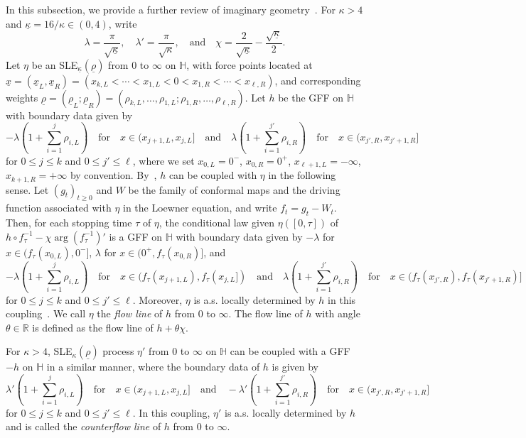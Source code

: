 \documentclass[a4paper]{article}
\numberwithin{equation}{section}
\numberwithin{equation}{section}
\renewcommand{\1}{\mathbf{1}}
\begin{document}
In this subsection, we provide a further review of imaginary geometry~\cite{IG1,IG4}. For $\kappa>4$ and $\underline{\kappa}=16/\kappa \in (0,4)$, write
\begin{equation}\label{eq:ig-parameter}
    \lambda=\frac{\pi}{\sqrt{\underline{\kappa}}}, \quad \lambda'=\frac{\pi}{\sqrt{\kappa}}, \quad \mbox{and} \quad \chi=\frac{2}{\sqrt{\underline{\kappa}}}-\frac{\sqrt{\underline{\kappa}}}{2}.
\end{equation}
Let $\eta$ be an SLE$_{\underline{\kappa}}(\underline{\rho})$ from 0 to $\infty$ on $\mathbb H$, with force points located at $\underline{x}=(\underline{x}_L,\underline{x}_R)=(x_{k,L}<\cdots<x_{1,L}<0<x_{1,R}<\cdots<x_{\ell,R})$, and corresponding weights $\underline{\rho}=(\underline{\rho}_L;\underline{\rho}_R)=(\rho_{k,L},\ldots,\rho_{1,L};\rho_{1,R},\ldots,\rho_{\ell,R})$. Let $h$ be the GFF on $\mathbb H$ with boundary data given by
\begin{equation}\label{eq:ig-boundary-data-simple}
    -\lambda(1+\sum_{i=1}^j \rho_{i,L}) \quad \mbox{for} \quad x \in (x_{j+1,L},x_{j,L}] \quad \mbox{and} \quad \lambda(1+\sum_{i=1}^{j'} \rho_{i,R}) \quad \mbox{for} \quad x \in (x_{j',R},x_{j'+1,R}]
\end{equation}
for $0 \le j \le k$ and $0 \le j' \le \ell$, where we set $x_{0,L}=0^-$, $x_{0,R}=0^+$, $x_{\ell+1,L}=-\infty$, $x_{k+1,R}=+\infty$ by convention. By~\cite[Theorem 1.1]{IG1}, $h$ can be coupled with $\eta$ in the following sense. Let $(g_t)_{t \ge 0}$ and $W$ be the family of conformal maps and the driving function associated with $\eta$ in the Loewner equation, and write $f_t=g_t-W_t$. Then, for each stopping time $\tau$ of $\eta$, the conditional law given $\eta([0,\tau])$ of $h \circ f_\tau^{-1}-\chi \arg (f_\tau^{-1})'$ is a GFF on $\mathbb H$ with boundary data given by $-\lambda$ for $x \in (f_\tau(x_{0,L}),0^-]$, $\lambda$ for $x \in (0^+,f_\tau(x_{0,R})]$, and
\[ -\lambda(1+\sum_{i=1}^j \rho_{i,L}) \quad \mbox{for} \quad x \in (f_\tau(x_{j+1,L}),f_\tau(x_{j,L}]) \quad \mbox{and} \quad \lambda(1+\sum_{i=1}^{j'} \rho_{i,R}) \quad \mbox{for} \quad x \in (f_\tau(x_{j',R}),f_\tau(x_{j'+1,R})] \]
for $0 \le j \le k$ and $0 \le j' \le \ell$. Moreover, $\eta$ is a.s. locally determined by $h$ in this coupling~\cite[Theorem 1.2]{IG1}. We call $\eta$ the \emph{flow line} of $h$ from 0 to $\infty$. The flow line of $h$ with angle $\theta \in \mathbb R$ is defined as the flow line of $h+\theta\chi$. 

For $\kappa>4$, SLE$_\kappa(\underline{\rho})$ process $\eta'$ from 0 to $\infty$ on $\mathbb H$ can be coupled with a GFF $-h$ on $\mathbb H$ in a similar manner, where the boundary data of $h$ is given by
\begin{equation}\label{eq:ig-boundary-data-nonsimple}
    \lambda'(1+\sum_{i=1}^j \rho_{i,L}) \quad \mbox{for} \quad x \in (x_{j+1,L},x_{j,L}] \quad \mbox{and} \quad -\lambda'(1+\sum_{i=1}^{j'} \rho_{i,R}) \quad \mbox{for} \quad x \in (x_{j',R},x_{j'+1,R}]
\end{equation}
for $0 \le j \le k$ and $0 \le j' \le \ell$. In this coupling, $\eta'$ is a.s. locally determined by $h$ and is called the \emph{counterflow line} of $h$ from 0 to $\infty$.
\end{document}
